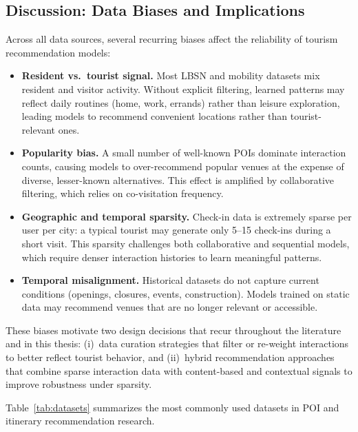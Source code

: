 \subsection{Discussion: Data Biases and Implications}
\label{sec:sota-data-bias}

Across all data sources, several recurring biases affect the reliability of tourism recommendation models:
%
\begin{itemize}
  \item \textbf{Resident vs.\ tourist signal.} Most LBSN and mobility datasets mix resident and visitor activity. Without explicit filtering, learned patterns may reflect daily routines (home, work, errands) rather than leisure exploration, leading models to recommend convenient locations rather than tourist-relevant ones.
  
  \item \textbf{Popularity bias.} A small number of well-known POIs dominate interaction counts, causing models to over-recommend popular venues at the expense of diverse, lesser-known alternatives. This effect is amplified by collaborative filtering, which relies on co-visitation frequency.
  
  \item \textbf{Geographic and temporal sparsity.} Check-in data is extremely sparse per user per city: a typical tourist may generate only 5--15 check-ins during a short visit. This sparsity challenges both collaborative and sequential models, which require denser interaction histories to learn meaningful patterns.
  
  \item \textbf{Temporal misalignment.} Historical datasets do not capture current conditions (openings, closures, events, construction). Models trained on static data may recommend venues that are no longer relevant or accessible.
\end{itemize}

These biases motivate two design decisions that recur throughout the literature and in this thesis: (i)~data curation strategies that filter or re-weight interactions to better reflect tourist behavior, and (ii)~hybrid recommendation approaches that combine sparse interaction data with content-based and contextual signals to improve robustness under sparsity.

Table~\ref{tab:datasets} summarizes the most commonly used datasets in POI and itinerary recommendation research.

